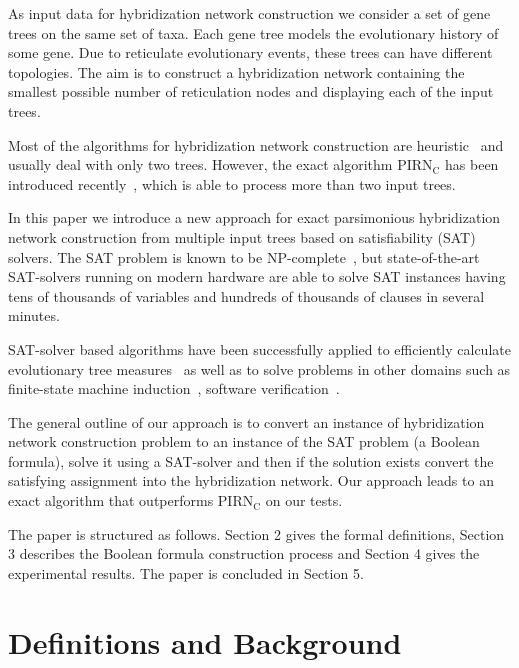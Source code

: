 \documentclass[runningheads, envcountsame, a4paper]{llncs}
\begin{document}
As input data for hybridization network construction we consider a set of gene trees on the same set of taxa.
Each gene tree models the evolutionary history of some gene. 
Due to reticulate evolutionary events, these trees can have different topologies.
The aim is to construct a hybridization network containing the smallest possible number of 
reticulation nodes and displaying each of the input trees. 

Most of the algorithms for hybridization network construction are heuristic~\cite{wu2013algorithm, park2012murpar} 
and usually deal with only two trees.
However, the exact algorithm PIRN$_\mathrm{C}$ has been introduced recently~\cite{wu2013algorithm}, which is able to process more than two input trees.

In this paper we introduce a new approach for exact parsimonious
hybridization network construction from multiple input trees based on satisfiability (SAT) solvers.
The SAT problem is known to be NP-complete~\cite{bordewich2007computing}, but state-of-the-art SAT-solvers running on modern hardware 
are able to solve SAT instances having tens of thousands of variables and hundreds of thousands of clauses in several minutes.

SAT-solver based algorithms have been successfully applied to efficiently calculate evolutionary tree measures~\cite{bonet2009efficiently}
as well as to solve problems in other domains such as
finite-state machine induction~\cite{heule2010exact}, software verification~\cite{biere2003bounded}.

The general outline of our approach is to convert an instance of hybridization network construction 
problem to an instance of the SAT problem (a Boolean formula), solve it using a SAT-solver and then if the
solution exists convert 
the satisfying assignment into the hybridization network.
Our approach leads to an exact algorithm that outperforms PIRN$\mathrm{_C}$ on our tests.

The paper is structured as follows. Section 2 gives the formal definitions, Section 3 describes the Boolean formula
construction process and Section 4 gives the experimental results. The paper is concluded in Section 5.

\section{Definitions and Background}
\end{document}
